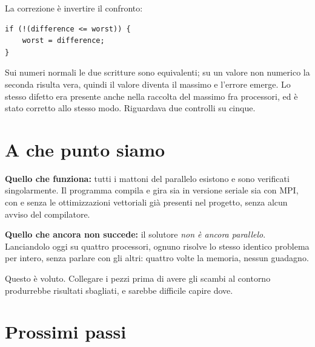 \documentclass[11pt,a4paper]{article}
\begin{document}
La correzione è invertire il confronto:

\begin{lstlisting}
if (!(difference <= worst)) {
    worst = difference;
}
\end{lstlisting}

Sui numeri normali le due scritture sono equivalenti; su un valore non numerico
la seconda risulta vera, quindi il valore diventa il massimo e l'errore emerge.
Lo stesso difetto era presente anche nella raccolta del massimo fra processori,
ed è stato corretto allo stesso modo. Riguardava due controlli su cinque.

\section{A che punto siamo}

\textbf{Quello che funziona:} tutti i mattoni del parallelo esistono e sono
verificati singolarmente. Il programma compila e gira sia in versione seriale
sia con MPI, con e senza le ottimizzazioni vettoriali già presenti nel progetto,
senza alcun avviso del compilatore.

\textbf{Quello che ancora non succede:} il solutore \emph{non è ancora
parallelo}. Lanciandolo oggi su quattro processori, ognuno risolve lo stesso
identico problema per intero, senza parlare con gli altri: quattro volte la
memoria, nessun guadagno.

Questo è voluto. Collegare i pezzi prima di avere gli scambi al contorno
produrrebbe risultati sbagliati, e sarebbe difficile capire dove.

\section{Prossimi passi}
\end{document}
